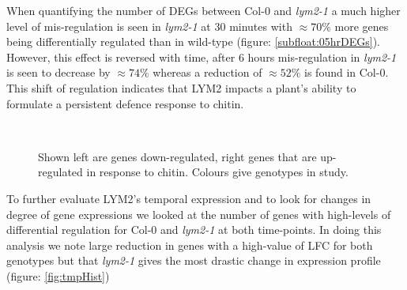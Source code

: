 \documentclass[../main.tex]{subfiles}
\begin{document}
When quantifying the number of DEGs between Col-0 and \textit{lym2-1} a much
higher level of mis-regulation is seen in \textit{lym2-1} at 30 minutes with
$\approx70\%$ more genes being differentially regulated than in wild-type (figure: \ref{subfloat:05hrDEGs}).
However, this effect is reversed with time, after 6 hours mis-regulation in
\textit{lym2-1} is seen to decrease by $\approx74\%$ whereas a reduction of $\approx52\%$ is
found in Col-0. This shift of regulation indicates that LYM2 impacts a plant's
ability to formulate a persistent defence response to chitin. 

\begin{figure}[!ht]
  \centering  
  \\
  \caption[Number of differential genes found in chitin treated plants]{Shown
    left are genes down-regulated, right genes that are up-regulated in response
    to chitin. Colours give genotypes in study.}
  \label{fig:DEGsVenn}
\end{figure}

To further evaluate LYM2's temporal expression and to look for changes in degree
of gene expressions we looked at the number of genes with high-levels of
differential regulation for Col-0 and \textit{lym2-1} at both time-points. In doing this
analysis we note large reduction in genes with a high-value of LFC for both
genotypes but that \textit{lym2-1} gives the most drastic change in expression
profile (figure: \ref{fig:tmpHist})
\end{document}
